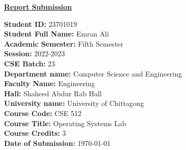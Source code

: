 \documentclass[12pt,a4paper]{article}
\begin{document}
\begin{titlepage}
    \centering
    \vspace*{1cm}
    
    {\Large\bfseries\color{blue} \underline{Report Submission}\par}
    
    \vspace{2cm}
    
    \begin{flushleft}
        \large
        \textbf{Student ID:} 23701019 \\
        \vspace{0.4cm}
        \textbf{Student Full Name:} Emran Ali \\
        \vspace{0.4cm}
        \textbf{Academic Semester: } Fifth Semester\\
        \vspace{0.4cm}
        \textbf{Session: } 2022-2023\\
        \vspace{0.4cm}
        \textbf{CSE Batch:} 23\\
        \vspace{0.4cm}
        \textbf{Department name:} Computer Science and Engineering \\
        \vspace{0.4cm}
        \textbf{Faculty Name:} Engineering \\
        \vspace{0.4cm}
        \textbf{Hall:} Shaheed Abdur Rab Hall \\
        \vspace{0.4cm}
        \textbf{University name:} University of Chittagong \\
        \vspace{0.4cm}
        \textbf{Course Code:} CSE 512 \\
        \vspace{0.4cm}
        \textbf{Course Title:} Operating Systems Lab \\
        \vspace{0.4cm}
        \textbf{Course Credits:} 3 \\
        \vspace{0.4cm}
        \textbf{Date of Submission:} \today
    \end{flushleft}


\end{titlepage}
\end{document}
